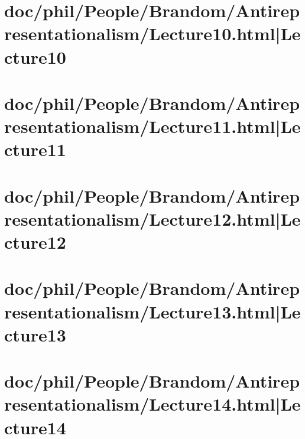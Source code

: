 \documentclass[12pt,a4paper]{report}
\begin{document}
\part{doc/phil/People/Brandom/Antirepresentationalism/Lecture10.html|Lecture10}

\part{doc/phil/People/Brandom/Antirepresentationalism/Lecture11.html|Lecture11}

\part{doc/phil/People/Brandom/Antirepresentationalism/Lecture12.html|Lecture12}

\part{doc/phil/People/Brandom/Antirepresentationalism/Lecture13.html|Lecture13}

\part{doc/phil/People/Brandom/Antirepresentationalism/Lecture14.html|Lecture14}
\end{document}
